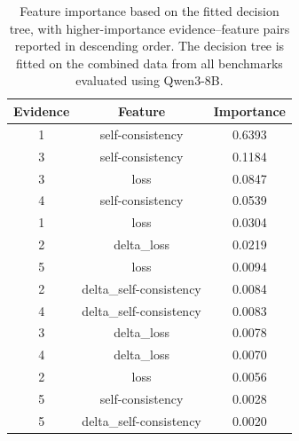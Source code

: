 \begin{table}[t]
\centering
\caption{Feature importance based on the fitted decision tree, with higher-importance evidence--feature pairs reported in descending order. The decision tree is fitted on the combined data from all benchmarks evaluated using Qwen3-8B.}
\label{tab:feature_importance}
\begin{tabular}{ccc}
\toprule
\textbf{Evidence} & \textbf{Feature} & \textbf{Importance} \\
\midrule
1 & self-consistency        & 0.6393 \\
3 & self-consistency        & 0.1184 \\
3 & loss             & 0.0847 \\
4 & self-consistency        & 0.0539 \\
1 & loss             & 0.0304 \\
2 & delta\_loss      & 0.0219 \\
5 & loss             & 0.0094 \\
2 & delta\_self-consistency & 0.0084 \\
4 & delta\_self-consistency & 0.0083 \\
3 & delta\_loss      & 0.0078 \\
4 & delta\_loss      & 0.0070 \\
2 & loss             & 0.0056 \\
5 & self-consistency        & 0.0028 \\
5 & delta\_self-consistency & 0.0020 \\
\bottomrule
\end{tabular}
\end{table}